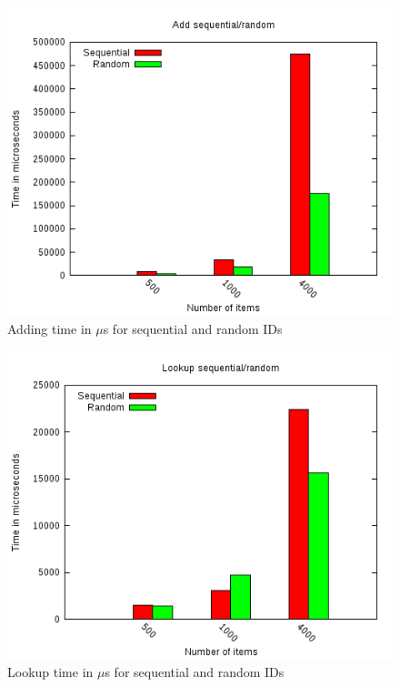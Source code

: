 \documentclass[a4paper, 10pt]{article}
\begin{document}
\begin{figure}[h!]
\begin{center}
    \includegraphics[scale=0.4]{histograms/add_seq_rnd.png}
    \caption{Adding time in $\mu$s for sequential and random IDs}
    \label{fig:add}
\end{center}
\end{figure}

\begin{figure}[h!]
\begin{center}
    \includegraphics[scale=0.4]{histograms/lookup_seq_rnd.png}
    \caption{Lookup time in $\mu$s for sequential and random IDs}
    \label{fig:lookup}
\end{center}
\end{figure}
\end{document}
